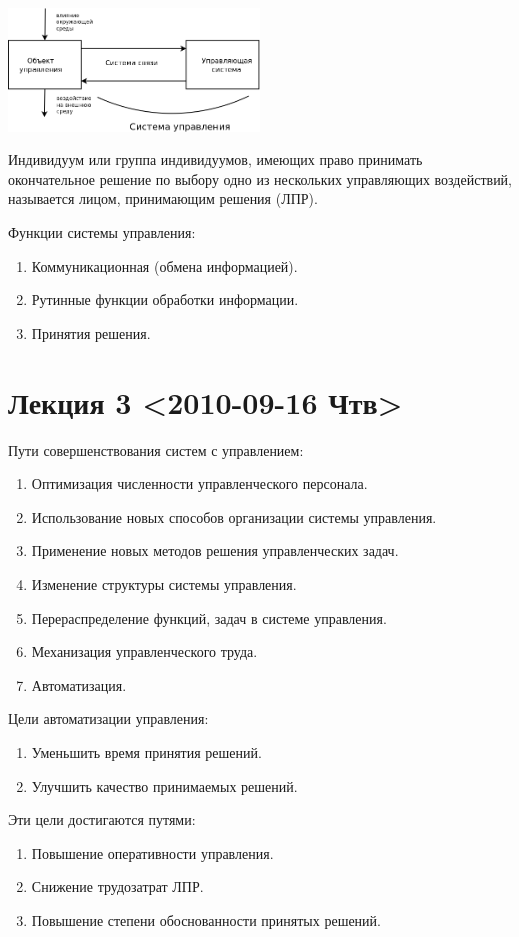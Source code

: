 \documentclass[12pt, russian, oneside, article]{ncc}
\begin{document}
\includegraphics[width=0.5\textwidth]{images/TS/sistema.png}

Индивидуум или группа индивидуумов, имеющих право принимать окончательное решение по выбору одно из нескольких управляющих воздействий, называется лицом, принимающим решения (ЛПР).

Функции системы управления:
\begin{enumerate}
\item Коммуникационная (обмена информацией).
\item Рутинные функции обработки информации.
\item Принятия решения.
\end{enumerate}
\section{Лекция 3 <2010-09-16 Чтв>}
\label{sec-3}


Пути совершенствования систем с управлением:
\begin{enumerate}
\item Оптимизация численности управленческого персонала.
\item Использование новых способов организации системы управления.
\item Применение новых методов решения управленческих задач.
\item Изменение структуры системы управления.
\item Перераспределение функций, задач в системе управления.
\item Механизация управленческого труда.
\item Автоматизация.
\end{enumerate}

Цели автоматизации управления:
\begin{enumerate}
\item Уменьшить время принятия решений.
\item Улучшить качество принимаемых решений.
\end{enumerate}

Эти цели достигаются путями:
\begin{enumerate}
\item Повышение оперативности управления.
\item Снижение трудозатрат ЛПР.
\item Повышение степени обоснованности принятых решений.
\end{enumerate}
\end{document}
